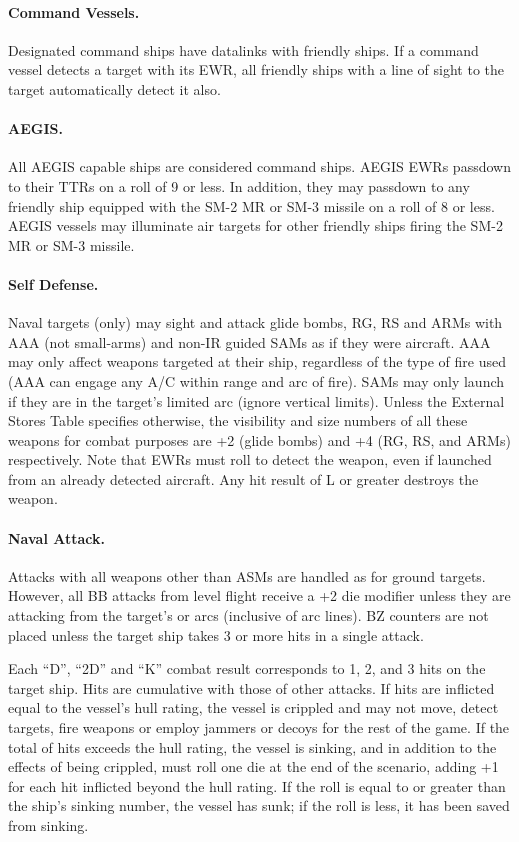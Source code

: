 \paragraph{Command Vessels.}

Designated command ships have data\-links with friendly ships. If a command vessel detects a target with its EWR, all friendly ships with a line of sight to the target automatically detect it also.

\paragraph{AEGIS.}

All AEGIS capable ships are considered command ships.   AEGIS EWRs passdown to their TTRs on a roll of 9 or less.  In addition, they may passdown to any friendly ship equipped with the SM-2 MR or SM-3 missile on a roll of 8 or less.  AEGIS vessels may illuminate air targets for other friendly ships firing the SM-2 MR or SM-3 missile.

\paragraph{Self Defense.}  Naval targets (only) may sight and attack glide bombs, RG, RS and ARMs with AAA (not small-arms) and non-IR guided SAMs as if they were aircraft.  AAA may only affect weapons targeted at their ship, regardless of the type of fire used (AAA can engage any A/C within range and arc of fire).  SAMs may only launch if they are in the target's limited arc (ignore vertical limits).  Unless the External Stores Table specifies otherwise, the visibility and size numbers of all these weapons for combat purposes are +2 (glide bombs) and +4 (RG, RS, and ARMs) respectively.  Note that EWRs must roll to detect the weapon, even if launched from an already detected aircraft.  Any hit result of L or greater destroys the weapon.


\paragraph{Naval Attack.} Attacks with all weapons other than ASMs are handled as for ground targets.  However, all BB attacks from level flight receive a +2 die modifier unless they are attacking from the target's  or  arcs (inclusive of arc lines).  BZ counters are not placed unless the target ship takes 3 or more hits in a single attack.

Each “D”, “2D” and “K” combat result corresponds to 1, 2, and 3 hits on the target ship.  Hits are cumulative with those of other attacks.   If hits are inflicted equal to the vessel's hull rating, the vessel is crippled and may not move, detect targets, fire weapons or employ jammers or decoys for the rest of the game.  If the total of hits exceeds the hull rating, the vessel is sinking, and in addition to the effects of being crippled, must roll one die at the end of the scenario, adding +1 for each hit inflicted beyond the hull rating.  If the roll is equal to or greater than the ship's sinking number, the vessel has sunk; if the roll is less, it has been saved from sinking.

